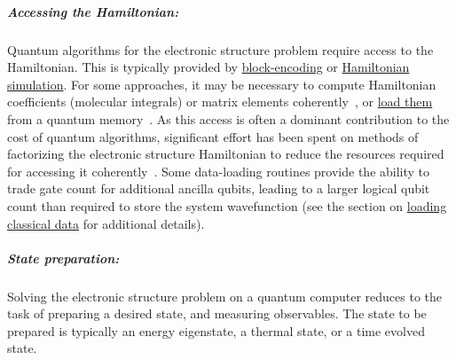 \begin{refsection}
\subparagraph{Accessing the Hamiltonian:}
Quantum algorithms for the electronic structure problem require access to the Hamiltonian. This is typically provided by \hyperref[prim:BlockEncodings]{block-encoding} or \hyperref[prim:HamiltonianSimulation]{Hamiltonian simulation}. For some approaches, it may be necessary to compute Hamiltonian coefficients (molecular integrals) or matrix elements coherently~\cite{kassal2008QuantumSimChemicalDynamics,babbush2017ExponentiallyConfigInt, babbush2016ExponentiallySecondQuant, babbush2019FirstQuantizedSublinear, su2021FaultTolerantChemistryFirstQuantized,chan2023RealSpaceChemistry}, or \hyperref[prim:LoadingClassicalData]{load them} from a quantum memory~\cite{Berry2019QubitizationOfArbitraryBasisChemistry,burg2021QuantumComputingEnhancedComputationalCataylysis,lee2021EvenMoreEfficientChemistryTensorHyp}. As this access is often a dominant contribution to the cost of quantum algorithms, significant effort has been spent on methods of factorizing the electronic structure Hamiltonian to reduce the resources required for accessing it coherently~\cite{motta2021lowrankrep,Berry2019QubitizationOfArbitraryBasisChemistry,burg2021QuantumComputingEnhancedComputationalCataylysis,lee2021EvenMoreEfficientChemistryTensorHyp, rubin2023MaterialsSim}. Some data-loading routines provide the ability to trade gate count for additional ancilla qubits, leading to a larger logical qubit count than required to store the system wavefunction (see the section on \hyperref[prim:LoadingClassicalData]{loading classical data} for additional details).





\subparagraph{State preparation:}
Solving the electronic structure problem on a quantum computer reduces to the task of preparing a desired state, and measuring observables. The state to be prepared is typically an energy eigenstate, a thermal state, or a time evolved state.



\end{refsection}
